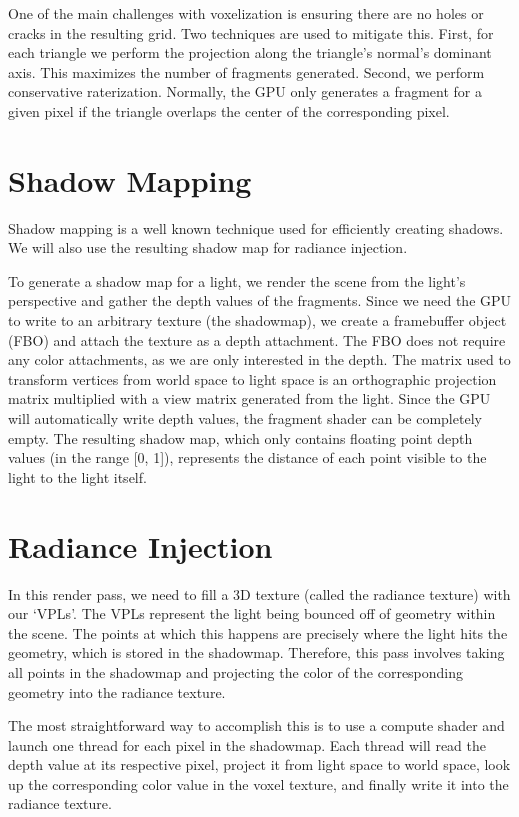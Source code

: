 One of the main challenges with voxelization is ensuring there are no holes or cracks in the resulting grid. Two techniques are used to mitigate this. First, for each triangle we perform the projection along the triangle's normal's dominant axis. This maximizes the number of fragments generated. Second, we perform conservative raterization. Normally, the GPU only generates a fragment for a given pixel if the triangle overlaps the center of the corresponding pixel. 


\section{Shadow Mapping}
Shadow mapping is a well known technique used for efficiently creating shadows. We will also use the resulting shadow map for radiance injection.

To generate a shadow map for a light, we render the scene from the light's perspective and gather the depth values of the fragments. Since we need the GPU to write to an arbitrary texture (the shadowmap), we create a framebuffer object (FBO) and attach the texture as a depth attachment. The FBO does not require any color attachments, as we are only interested in the depth. The matrix used to transform vertices from world space to light space is an orthographic projection matrix multiplied with a view matrix generated from the light. Since the GPU will automatically write depth values, the fragment shader can be completely empty. The resulting shadow map, which only contains floating point depth values (in the range [0, 1]), represents the distance of each point visible to the light to the light itself.

\section{Radiance Injection}
In this render pass, we need to fill a 3D texture (called the radiance texture) with our `VPLs'. The VPLs represent the light being bounced off of geometry within the scene. The points at which this happens are precisely where the light hits the geometry, which is stored in the shadowmap. Therefore, this pass involves taking all points in the shadowmap and projecting the color of the corresponding geometry into the radiance texture.

The most straightforward way to accomplish this is to use a compute shader and launch one thread for each pixel in the shadowmap. Each thread will read the depth value at its respective pixel, project it from light space to world space, look up the corresponding color value in the voxel texture, and finally write it into the radiance texture.

